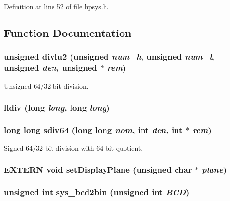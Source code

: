 Definition at line 52 of file hpsys.h.

\subsection{Function Documentation}
\subsubsection{\setlength{\rightskip}{0pt plus 5cm}unsigned divlu2 (unsigned {\em num\_\-h}, unsigned {\em num\_\-l}, unsigned {\em den}, unsigned $\ast$ {\em rem})}\label{hpsys_8h_a11}


Unsigned 64/32 bit division.

\subsubsection{ lldiv (long {\em long}, long {\em long})}\label{hpsys_8h_a10}


\subsubsection{\setlength{\rightskip}{0pt plus 5cm}long long sdiv64 (long long {\em nom}, int {\em den}, int $\ast$ {\em rem})}\label{hpsys_8h_a13}


Signed 64/32 bit division with 64 bit quotient.

\subsubsection{\setlength{\rightskip}{0pt plus 5cm}EXTERN void set\-Display\-Plane (unsigned char $\ast$ {\em plane})}\label{hpsys_8h_a29}


\subsubsection{\setlength{\rightskip}{0pt plus 5cm}unsigned int sys\_\-bcd2bin (unsigned int {\em BCD})}\label{hpsys_8h_a9}


